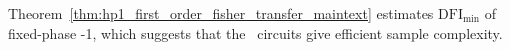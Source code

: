 \documentclass[reprint, aps, prl, superscriptaddress]{revtex4-2}
\newcommand{\rev}[1]{\textcolor{revisioncolor}{#1}}
\newcommand{\myqc}{\text{HP}}
\newcommand{\fii}{\mathrm{DFI}}
\newtheorem{theorem}{Theorem}
\begin{document}
\rev{Theorem~\ref{thm:hp1_first_order_fisher_transfer_maintext} estimates $\fii_{\min}$ of fixed-phase \myqc-1, which suggests that the \myqc~circuits give efficient sample complexity.}











\end{document}
